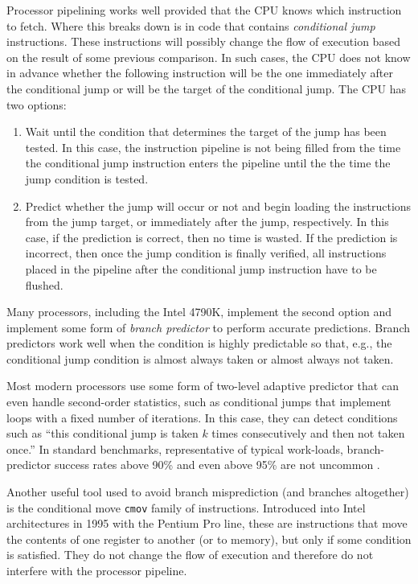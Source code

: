 \documentclass{patmorin}
\begin{document}
Processor pipelining works well provided that the CPU knows which
instruction to fetch.  Where this breaks down is in code that contains
\emph{conditional jump} instructions. These instructions will possibly
change the flow of execution based on the result of some previous
comparison.  In such cases, the CPU does not know in advance whether the
following instruction will be the one immediately after the conditional
jump or will be the target of the conditional jump. The CPU has two
options:
\begin{enumerate}
  \item Wait until the condition that determines the target
   of the jump has been tested. In this case, the instruction pipeline
   is not being filled from the time the conditional jump instruction
   enters the pipeline until the the time the jump condition is tested.

  \item Predict whether the jump will occur or not and begin loading
  the instructions from the jump target, or immediately after the jump,
  respectively.  In this case, if the prediction is correct, then no
  time is wasted. If the prediction is incorrect, then once the jump
  condition is finally verified, all instructions placed in the pipeline
  after the conditional jump instruction have to be flushed.
\end{enumerate}

Many processors, including the Intel 4790K, implement the second
option and implement some form of \emph{branch predictor} to perform
accurate predictions.  Branch predictors work well when the condition
is highly predictable so that, e.g., the conditional jump condition is
almost always taken or almost always not taken.

Most modern processors use some form of two-level adaptive predictor
\cite{yeh.patt:two-level} that can even handle second-order statistics,
such as conditional jumps that implement loops with a fixed number of
iterations. In this case, they can detect conditions such as ``this
conditional jump is taken $k$ times consecutively and then not taken
once.''  In standard benchmarks, representative of typical work-loads,
branch-predictor success rates above 90\% and even above 95\% are not
uncommon \cite{yeh.patt:alternative}.

Another useful tool used to avoid branch misprediction (and branches
altogether) is the conditional move \texttt{cmov} family
of instructions.  Introduced into Intel architectures in 1995 with
the Pentium Pro line, these are instructions that move the contents of
one register to another (or to memory), but only if some condition is
satisfied. They do not change the flow of execution and therefore do
not interfere with the processor pipeline.
\end{document}
